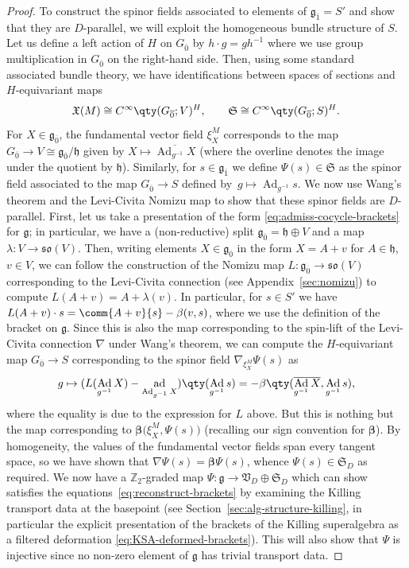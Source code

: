 \documentclass[10pt,a4paper]{amsart}
\numberwithin{equation}{section}
\newcommand{\fg}{\mathfrak{g}}
\newcommand{\fh}{\mathfrak{h}}
\newcommand{\fso}{\mathfrak{so}}
\newcommand{\fX}{\mathfrak{X}}
\newcommand{\fS}{\mathfrak{S}}
\newcommand{\fV}{\mathfrak{V}}
\newcommand{\ZZ}{\mathbb{Z}}
\newcommand{\1}{\mathbbm{1}}
\DeclareMathOperator{\Ad}{Ad}
\DeclareMathOperator{\ad}{ad}
\begin{document}
\begin{proof}
	To construct the spinor fields associated to elements of $\fg_{\overline 1}=S'$ and show that they are $D$-parallel, we will exploit the homogeneous bundle structure of $S$. Let us define a left action of $H$ on $G_{\overline 0}$ by $h\cdot g=gh^{-1}$ where we use group multiplication in $G_{\overline 0}$ on the right-hand side. Then, using some standard associated bundle theory, we have identifications between spaces of sections and $H$-equivariant maps
	\[
		\fX(M) \cong C^\infty\qty(G_{\overline 0};V)^H,\qquad
		\fS \cong C^\infty\qty(G_{\overline 0};S)^H.
	\]
	For $X\in\fg_{\overline 0}$, the fundamental vector field $\xi^M_X$ corresponds to the map $G_{\overline 0}\to V\cong\fg_{\overline 0}/\fh$ given by $X\mapsto \overline{\Ad_{g^{-1}}X}$ (where the overline denotes the image under the quotient by $\fh$). Similarly, for $s\in \fg_{\overline 1}$ we define $\Psi(s)\in\fS$ as the spinor field associated to the map $G_{\overline 0}\to S$ defined by~${g\mapsto \Ad_{g^{-1}}s}$. We now use Wang's theorem and the Levi-Civita Nomizu map to show that these spinor fields are $D$-parallel. First, let us take a presentation of the form \eqref{eq:admiss-cocycle-brackets} for $\fg$; in particular, we have a (non-reductive) split $\fg_{\overline0}=\fh\oplus V$ and a map $\lambda\colon V\to\fso(V)$. Then, writing elements $X\in\fg_{\overline 0}$ in the form $X=A+v$ for $A\in\fh$, $v\in V$, we can follow the construction of the Nomizu map $L\colon \fg_{\overline 0}\to\fso(V)$ corresponding to the Levi-Civita connection (see Appendix~\ref{sec:nomizu}) to compute
$L(A+v) = A + \lambda(v)$.
	In particular, for $s\in S'$ we have $L(A+v)\cdot s = \comm{A+v}{s} - \beta(v,s)$, where we use the definition of the bracket on $\fg$. Since this is also the map corresponding to the spin-lift of the Levi-Civita connection $\nabla$ under Wang's theorem, we can compute the $H$-equivariant map $G_{\overline 0}\to S$ corresponding to the spinor field $\nabla_{\xi^M_X}\Psi(s)$ as
	\[
		g \mapsto (L(\Ad_{g^{-1}}X) - \ad_{\Ad_{g^{-1}}X})\qty(\Ad_{g^{-1}}s) = - \beta\qty(\overline{\Ad_{g^{-1}}X},\Ad_{g^{-1}}s),
	\]
	where the equality is due to the expression for $L$ above. But this is nothing but the map corresponding to $\boldsymbol{\beta}\bigl(\xi^M_X,\Psi(s)\bigr)$ (recalling our sign convention for $\boldsymbol{\beta}$). By homogeneity, the values of the fundamental vector fields span every tangent space, so we have shown that $\nabla\Psi(s)=\boldsymbol{\beta}\Psi(s)$, whence $\Psi(s)\in\fS_D$ as required. We now have a $\ZZ_2$-graded map $\Psi\colon\fg\to\fV_D\oplus\fS_D$ which can show satisfies the equations~\eqref{eq:reconstruct-brackets} by examining the Killing transport data at the basepoint (see Section~\ref{sec:alg-structure-killing}, in particular the explicit presentation of the brackets of the Killing superalgebra as a filtered deformation \eqref{eq:KSA-deformed-brackets}). This will also show that $\Psi$ is injective since no non-zero element of $\fg$ has trivial transport data.
	

\end{proof}
\end{document}
